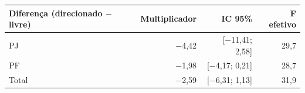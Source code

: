 \begin{tabular}{lrrr}
\toprule
Diferença (direcionado $-$ livre) & Multiplicador & IC 95\% & F efetivo \\
\midrule
PJ & \ensuremath{-}4{,}42 & [\ensuremath{-}11{,}41; 2{,}58] & 29{,}7 \\
PF & \ensuremath{-}1{,}98 & [\ensuremath{-}4{,}17; 0{,}21] & 28{,}7 \\
Total & \ensuremath{-}2{,}59 & [\ensuremath{-}6{,}31; 1{,}13] & 31{,}9 \\
\bottomrule
\end{tabular}
